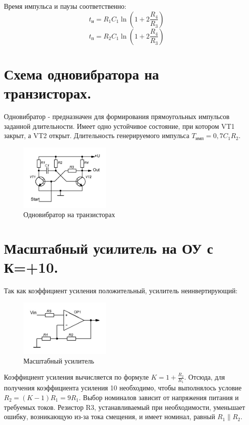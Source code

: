 \documentclass[unicode, 12pt, a4paper, oneside]{article}
\begin{document}
Время импульса и паузы соответственно:
\begin{displaymath}
t_\text{и} = R_1 C_1 \ln (1 + 2 \frac{R_4}{R_3} )
\end{displaymath}
\begin{displaymath}
t_\text{п} = R_2 C_1 \ln (1 + 2 \frac{R_4}{R_3} )
\end{displaymath}
\section{Схема одновибратора на транзисторах.}

Одновибратор - предназначен для формирования прямоугольных импульсов заданной длительности. Имеет одно устойчивое состояние, при котором VT1 закрыт, а VT2 открыт. Длительность генерируемого импульса $T_\text{имп} = 0,7 C_1 R_2 $.

\begin{figure}[H]
\centering
\includegraphics[width=0.4\textwidth]{142.jpg}
\caption{Одновибратор на транзисторах}
\end{figure}

\section{Масштабный усилитель на ОУ с К=+10.}

Так как коэффициент усиления положительный, усилитель неинвертирующий:
\begin{figure}[H]
\centering
\includegraphics[width=0.4\textwidth]{143.jpg}
\caption{Масштабный усилитель}
\end{figure}
Коэффициент усиления вычисляется по формуле $K = 1 + \frac{R_2}{R_1} $. Отсюда, для получения коэффициента усиления 10 необходимо, чтобы выполнялось условие $R_2 = (K - 1) R_1 = 9 R_1$. Выбор номиналов зависит от напряжения питания и требуемых токов. Резистор R3, устанавливаемый при необходимости, уменьшает ошибку, возникающую из-за тока смещения, и имеет номинал, равный $R_1 \parallel R_2$.
\end{document}
